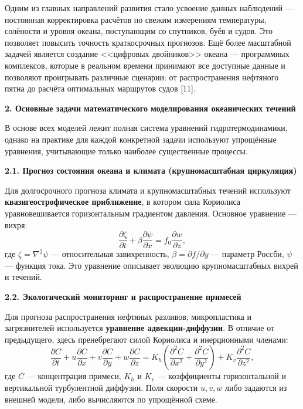 \documentclass[a4paper,14pt]{extarticle}
\begin{document}
\noindent Одним из главных направлений развития стало усвоение данных наблюдений — постоянная корректировка расчётов по свежим измерениям температуры, солёности и уровня океана, поступающим со спутников, буёв и судов. Это позволяет повысить точность краткосрочных прогнозов. Ещё более масштабной задачей является создание <<цифровых двойников>> океана — программных комплексов, которые в реальном времени принимают все доступные данные и позволяют проигрывать различные сценарии: от распространения нефтяного пятна до расчёта оптимальных маршрутов судов [11].

\newpage


\begin{center}
    \textbf{\large 2. Основные задачи математического моделирования океанических течений}
\end{center}

\noindent В основе всех моделей лежит полная система уравнений гидротермодинамики, однако на практике для каждой конкретной задачи используют упрощённые уравнения, учитывающие только наиболее существенные процессы.

\vspace{\baselineskip}

\noindent \textbf{2.1. Прогноз состояния океана и климата (крупномасштабная циркуляция)}

\noindent Для долгосрочного прогноза климата и крупномасштабных течений используют \textbf{квазигеострофическое приближение}, в котором сила Кориолиса уравновешивается горизонтальным градиентом давления. Основное уравнение — вихря:
\begin{equation}
    \frac{\partial \zeta}{\partial t} + \beta \frac{\partial \psi}{\partial x} = f_0 \frac{\partial w}{\partial z},
\end{equation}
где $\zeta = \nabla^2 \psi$ — относительная завихренность, $\beta = \partial f / \partial y$ — параметр Россби, $\psi$ — функция тока. Это уравнение описывает эволюцию крупномасштабных вихрей и течений.

\vspace{\baselineskip}

\noindent \textbf{2.2. Экологический мониторинг и распространение примесей}

\noindent Для прогноза распространения нефтяных разливов, микропластика и загрязнителей используется \textbf{уравнение адвекции-диффузии}. В отличие от предыдущего, здесь пренебрегают силой Кориолиса и инерционными членами:
\begin{equation}
    \frac{\partial C}{\partial t} + u \frac{\partial C}{\partial x} + v \frac{\partial C}{\partial y} + w \frac{\partial C}{\partial z} = 
    K_h \left( \frac{\partial^2 C}{\partial x^2} + \frac{\partial^2 C}{\partial y^2} \right) + K_v \frac{\partial^2 C}{\partial z^2},
\end{equation}
где $C$ — концентрация примеси, $K_h$ и $K_v$ — коэффициенты горизонтальной и вертикальной турбулентной диффузии. Поля скорости $u, v, w$ либо задаются из внешней модели, либо вычисляются по упрощённой схеме.
\end{document}
